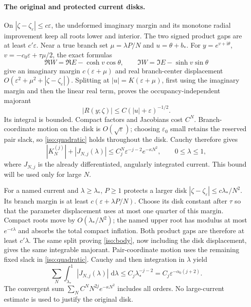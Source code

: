\documentclass[11pt]{article}
\numberwithin{equation}{section}
\theoremstyle{definition}
\newcommand{\ii}{\mathrm i}
\newcommand{\dd}{\,\mathrm d}
\newcommand{\eps}{\varepsilon}
\begin{document}
\paragraph{The original and protected current disks.}
On $|\zeta-\zeta_\eps|\le c\eps$, the undeformed imaginary margin
and its monotone radial improvement keep all roots lower and interior.
The two signed product gaps are at least $c'\eps$.
Near a true branch set $\mu=\lambda P/N$ and $u=\theta+b_*$.
For $y=e^{v+\ii\theta}$, $v=-c_0\eps+\tau\mu/2$, the exact formulas
\[
 \Re W=\Re E-\cosh v\cos\theta,\qquad
 \Im W=\Im E-\sinh v\sin\theta
\]
give an imaginary margin $c(\eps+\mu)$ and real branch-center
displacement $O(\eps^2+\mu^2+|\zeta-\zeta_\eps|)$.
Splitting at $|u|=K(\eps+\mu)$, first using the imaginary margin and
then the linear real term, proves the occupancy-independent majorant
\begin{equation}
 |R(y;\zeta)|\le C(|u|+\eps)^{-1/2}.
 \label{iso:body}
\end{equation}
Its integral is bounded. Compact factors and Jacobians cost $C^N$.
Branch-coordinate motion on the disk is $O(\sqrt\eps)$; choosing
$\eps_0$ small retains the reserved pair slack, so
\eqref{iso:quadratic} holds throughout the disk. Cauchy therefore gives
\begin{equation}
 |K_N^{(j)}|+|J_{N,j}(\lambda)|
 \le C_j^N\eps^{-j-2}e^{-\kappa N^2},\qquad0\le\lambda\le1,
 \label{iso:original-bound}
\end{equation}
where $J_{N,j}$ is the already differentiated, angularly integrated
current. This bound will be used only for large $N$.

For a named current and $\lambda\ge\lambda_*$, $P\ge1$ protects a
larger disk $|\zeta-\zeta_\eps|\le c\lambda_*/N^2$.
Its branch margin is at least $c(\eps+\lambda P/N)$.
Choose its disk constant after $\tau$ so that the parameter displacement
uses at most one quarter of this margin. Compact roots move by
$O(\lambda_*/N^2)$; the named upper root has modulus at most
$e^{-c\lambda}$ and absorbs the total compact inflation.
Both product gaps are therefore at least $c'\lambda$.
The same split proving \eqref{iso:body}, now including the disk
displacement, gives the same integrable majorant. Pair-coordinate motion
uses the remaining fixed slack in \eqref{iso:quadratic}.
Cauchy and then integration in $\lambda$ yield
\begin{equation}
 \sum_N\int_{\lambda_*}^1|J_{N,j}(\lambda)|\,\dd\lambda
 \le C_j\lambda_*^{-j-2}
 =C_j\eps^{-\alpha_0(j+2)}.
 \label{iso:large-current}
\end{equation}
The convergent sum $\sum_NC^NN^{2j}e^{-\kappa N^2}$ includes all
orders. No large-current estimate is used to justify the original disk.
\end{document}
